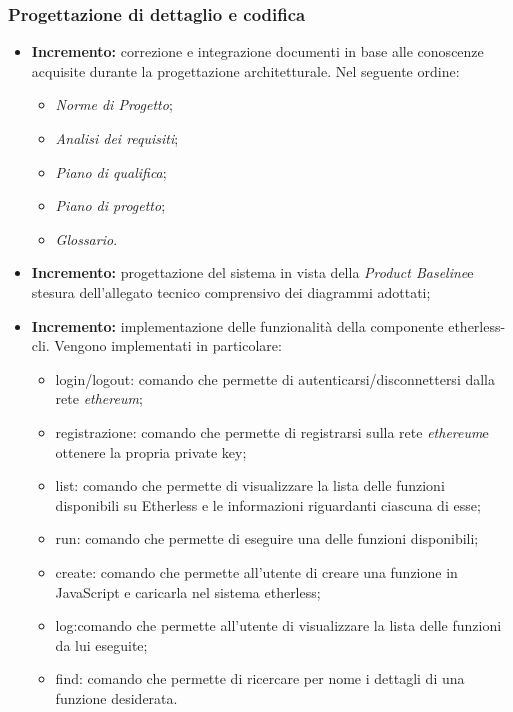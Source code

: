 \subsubsection{Progettazione di dettaglio e codifica}
\begin{itemize}
	\item \textbf{ Incremento:} correzione e integrazione documenti in base alle conoscenze acquisite durante la progettazione architetturale. Nel seguente ordine:
  \begin{itemize}
    \item \textit{Norme di Progetto}\docs;
    \item \textit{Analisi dei requisiti}\docs;
    \item \textit{Piano di qualifica}\docs;
    \item \textit{Piano di progetto}\docs;
    \item \textit{Glossario}\docs.
  \end{itemize}
	\item \textbf{ Incremento:} progettazione del sistema in vista della \textit{Product Baseline}\glo e stesura dell'allegato tecnico comprensivo dei diagrammi adottati;
	\item \textbf{ Incremento:} implementazione delle funzionalità della componente etherless-cli.
  Vengono implementati in particolare:
  \begin{itemize}
    \item login/logout: comando che permette di autenticarsi/disconnettersi dalla rete \textit{ethereum}\glos;
    \item registrazione: comando che permette di registrarsi sulla rete \textit{ethereum}\glo e ottenere la propria private key;
    \item list: comando che permette di visualizzare la lista delle funzioni disponibili su Etherless e le informazioni riguardanti ciascuna di esse;
    \item run: comando che permette di eseguire una delle funzioni disponibili;
    \item create: comando che permette all'utente di creare una funzione in JavaScript e caricarla nel sistema etherless;
    \item log:comando che permette all'utente di visualizzare la lista delle funzioni da lui eseguite;
    \item find: comando che permette di ricercare per nome i dettagli di una funzione desiderata.
  \end{itemize}

\end{itemize}
